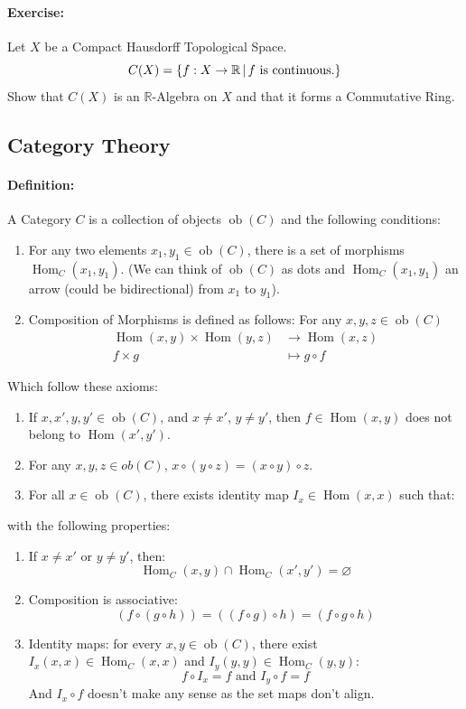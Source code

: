 \documentclass[12pt, oneside]{book}
\DeclareMathOperator{\Hom}{\mathrm{Hom}}
\DeclareMathOperator{\ob}{\mathrm{ob}}
\begin{document}
\paragraph{Exercise:} Let \(X\) be a Compact Hausdorff Topological Space.
\[C(X) = \{f: X \rightarrow \mathbb{R} \; \vline \; f \text{ is continuous.}\}\]
Show that \(C(X)\) is an \(\mathbb{R}\)-Algebra on \(X\) and that it forms a Commutative Ring.

\subsection{Category Theory}
\paragraph{Definition:} A Category \(C\) is a collection of objects \(\ob(C)\) and the following conditions:
\begin{enumerate}
    \item For any two elements \(x_1, y_1 \in \ob(C)\), there is a set of morphisms \(\Hom_C(x_1, y_1)\).
        (We can think of \(\ob(C)\) as dots and \(\Hom_C(x_1, y_1)\) an arrow (could be bidirectional) from \(x_1\) to \(y_1\)).
    \item Composition of Morphisms is defined as follows: For any \(x, y, z \in \ob(C)\)
        \begin{align*}
            \Hom(x,y) \times \Hom(y,z) &\rightarrow \Hom(x,z)\\
            f \times g &\mapsto g \circ f
        \end{align*}
\end{enumerate}
Which follow these axioms:
\begin{enumerate}
    \item If \(x, x', y, y' \in \ob(C)\), and \(x \neq x'\), \(y \neq y'\), then \(f \in \Hom(x,y)\) does not belong to \(\Hom(x', y')\).
    \item For any \(x,y,z \in ob(C)\), \(x \circ (y \circ z) = (x \circ y) \circ z\).
    \item For all \(x \in \ob(C)\), there exists identity map \(I_x \in \Hom(x,x)\) such that:
\end{enumerate}
with the following properties:
\begin{enumerate}
    \item If \(x \neq x'\) or \(y \neq y'\), then:
        \[\Hom_C (x,y) \cap \Hom_C (x',y') = \varnothing \]
    \item Composition is associative:
        \[(f \circ (g \circ h)) = ((f \circ g) \circ h) = (f \circ g \circ h)\]
    \item Identity maps: for every \(x,y \in \ob(C)\), there exist \(I_x(x,x) \in \Hom_C(x,x)\) and \(I_y(y,y) \in \Hom_C(y,y)\):
        \[f \circ I_x = f \text{ and } I_y \circ f = f\]
        And \(I_x \circ f\) doesn't make any sense as the set maps don't align.
\end{enumerate}
\end{document}
